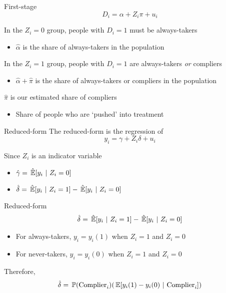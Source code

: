 \documentclass[aspectratio=169,t,11pt,table]{beamer}
\begin{document}
\begin{frame}{First-stage}
  \vspace*{-\bigskipamount}
  $$
    D_i = \alpha + Z_i \pi + u_i
  $$

  In the $Z_i = 0$ group, people with $D_i = 1$ must be always-takers
  \begin{itemize}
    \item $\hat{\alpha}$ is the share of always-takers in the population
  \end{itemize}
  
  \pause
  \bigskip
  In the $Z_i = 1$ group, people with $D_i = 1$ are always-takers \emph{or} compliers
  \begin{itemize}
    \item $\hat{\alpha} + \hat{\pi}$ is the share of always-takers or compliers in the population
  \end{itemize}

  \bigskip
  \pause
  $\hat{\pi}$ is our estimated share of compliers
  \begin{itemize}
    \item Share of people who are `pushed' into treatment
  \end{itemize}
\end{frame}

\begin{frame}{Reduced-form}
  The reduced-form is the regression of 
  $$
    y_i = \gamma + Z_i \delta + u_i
  $$

  Since $Z_i$ is an indicator variable
  \begin{itemize}
    \item $\hat{\gamma} = \expechat{y_i}{Z_i = 0}$
    \item $\hat{\delta} = \expechat{y_i}{Z_i = 1} - \expechat{y_i}{Z_i = 0}$ 
  \end{itemize}
\end{frame}

\begin{frame}{Reduced-form}
  \vspace*{-\bigskipamount}
  \begin{align*}
    \hat{\delta} = \expechat{y_i}{Z_i = 1} - \expechat{y_i}{Z_i = 0}
  \end{align*}
  \vspace*{-\bigskipamount}
  \begin{itemize}
    \item For always-takers, $y_i = y_i(1)$ when $Z_i = 1$ and $Z_i = 0$
    \item For never-takers, $y_i = y_i(0)$ when $Z_i = 1$ and $Z_i = 0$
  \end{itemize}

  \bigskip
  Therefore, 
  \begin{align*}
    \hat{\delta} = \prob{\text{Complier}_i} (\expec{y_i(1) - y_i(0)}{\text{Complier}_i})
  \end{align*}
\end{frame}
\end{document}
